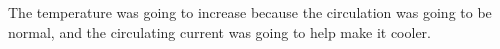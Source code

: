 The temperature was going to increase because the circulation was going to be normal, and the circulating current was going to help make it cooler.